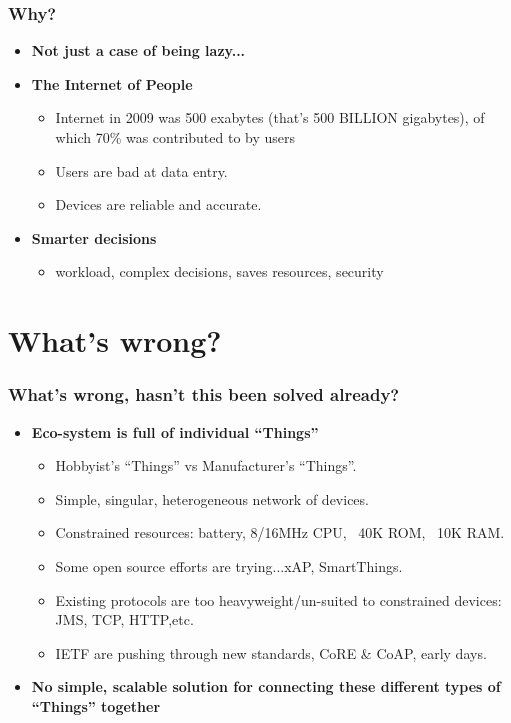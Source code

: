 \documentclass{beamer}
\begin{document}
\begin{frame}[t]\frametitle{Why?}
\begin{itemize}
  \item<1-> [--] \textbf{Not just a case of being lazy...}
  \item<2-> [--] \textbf{The Internet of People}
\begin{itemize}
  \item Internet in 2009 was 500 exabytes (that's 500 BILLION gigabytes), of which 70\% was contributed to by users
  \item Users are bad at data entry.
  \item Devices are reliable and accurate.
\end{itemize}
\item<3-> [--] \textbf{Smarter decisions}
  \begin{itemize}
      \item workload, complex decisions, saves resources, security
  \end{itemize}
\end{itemize}
\end{frame}


\section{What's wrong?} %
\begin{frame}[t]\frametitle{What's wrong, hasn't this been solved already?}
\label{sec:what_s_wrong_}
\begin{itemize}
  \item<1-> [--] \textbf{Eco-system is full of individual ``Things''}
  \begin{itemize}
    \item Hobbyist's ``Things'' vs Manufacturer's ``Things''.
    \item Simple, singular, heterogeneous network of devices.
    \item Constrained resources: battery, 8/16MHz CPU, ~40K ROM, ~10K RAM.
    \item Some open source efforts are trying...xAP, SmartThings.
    \item Existing protocols are too heavyweight/un-suited to constrained devices: JMS, TCP, HTTP,etc.
    \item IETF are pushing through new standards, CoRE \& CoAP, early days.
  \end{itemize}
  \item<2-> [--] \textbf{No simple, scalable solution for connecting these different types of ``Things'' together}
\end{itemize}
\end{frame}
\end{document}

